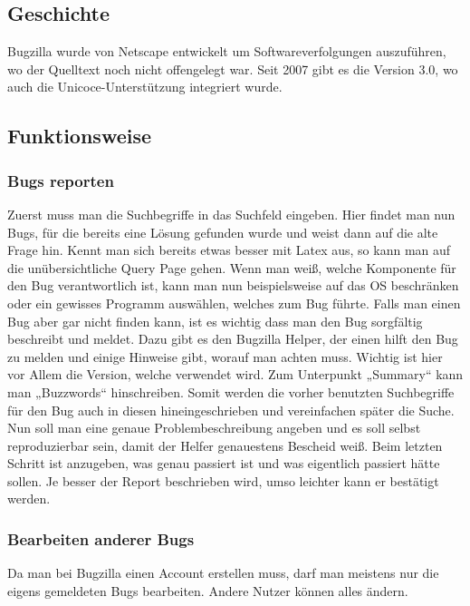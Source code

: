 \subsection{Geschichte}
Bugzilla wurde von Netscape entwickelt um Softwareverfolgungen auszuführen, wo der Quelltext noch nicht offengelegt war. Seit 2007 gibt es die Version 3.0, wo auch die Unicoce-Unterstützung integriert wurde.

\subsection{Funktionsweise}

\subsubsection{Bugs reporten}
Zuerst muss man die Suchbegriffe in das Suchfeld eingeben. Hier findet man nun Bugs, für die bereits eine Lösung gefunden wurde und weist dann auf die alte Frage hin.
Kennt man sich bereits etwas besser mit Latex aus, so kann man auf die unübersichtliche Query Page gehen. Wenn man weiß, welche Komponente für den Bug verantwortlich ist, kann man nun beispielsweise auf das OS beschränken oder ein gewisses Programm auswählen, welches zum Bug führte. 
Falls man einen Bug aber gar nicht finden kann, ist es wichtig dass man den Bug sorgfältig beschreibt und meldet. Dazu gibt es den Bugzilla Helper, der einen hilft den Bug zu melden und einige Hinweise gibt, worauf man achten muss. Wichtig ist hier vor Allem die Version, welche verwendet wird. Zum Unterpunkt „Summary“ kann man „Buzzwords“ hinschreiben. Somit werden die vorher benutzten Suchbegriffe für den Bug auch in diesen hineingeschrieben und vereinfachen später die Suche. Nun soll man eine genaue Problembeschreibung angeben und es soll selbst reproduzierbar sein, damit der Helfer genauestens Bescheid weiß. 
Beim letzten Schritt ist anzugeben, was genau passiert ist und was eigentlich passiert hätte sollen. 
Je besser der Report beschrieben wird, umso leichter kann er bestätigt werden.

\subsubsection{Bearbeiten anderer Bugs}
Da man bei Bugzilla einen Account erstellen muss, darf man meistens nur die eigens gemeldeten Bugs bearbeiten. Andere Nutzer können alles ändern.

